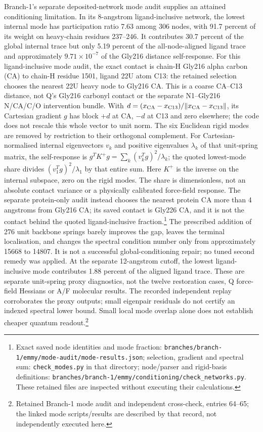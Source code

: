\documentclass{article}
\begin{document}
Branch-1's separate deposited-network mode audit supplies an attained conditioning limitation. In its 8-angstrom ligand-inclusive network, the lowest internal mode has participation ratio 7.63 among 306 nodes, with 91.7 percent of its weight on heavy-chain residues 237--246. It contributes 30.7 percent of the global internal trace but only 5.19 percent of the all-node-aligned ligand trace and approximately \(9.71\times10^{-7}\) of the Gly216 distance self-response. For this ligand-inclusive mode audit, the exact contact is chain-H Gly216 alpha carbon (CA) to chain-H residue 1501, ligand 22U atom C13: the retained selection chooses the nearest 22U heavy node to Gly216 CA. This is a coarse CA--C13 distance, not Q's Gly216 carbonyl contact or the separate N1--Gly216 N/CA/C/O intervention bundle. With \(d=(x_{\rm CA}-x_{\rm C13})/\lVert x_{\rm CA}-x_{\rm C13}\rVert\), its Cartesian gradient \(g\) has block \(+d\) at CA, \(-d\) at C13 and zero elsewhere; the code does not rescale this whole vector to unit norm. The six Euclidean rigid modes are removed by restriction to their orthogonal complement. For Cartesian-normalised internal eigenvectors \(v_k\) and positive eigenvalues \(\lambda_k\) of that unit-spring matrix, the self-response is \(g^TK^+g=\sum_k(v_k^Tg)^2/\lambda_k\); the quoted lowest-mode share divides \((v_1^Tg)^2/\lambda_1\) by that entire sum. Here \(K^+\) is the inverse on the internal subspace, zero on the rigid modes. The share is dimensionless, not an absolute contact variance or a physically calibrated force-field response. The separate protein-only audit instead chooses the nearest protein CA more than 4 angstroms from Gly216 CA; its saved contact is Gly226 CA, and it is not the contact behind the quoted ligand-inclusive fraction.\footnote{Exact saved node identities and mode fraction: \texttt{branches/branch-1/emmy/mode-audit/mode-results.json}; selection, gradient and spectral sum: \texttt{check\_modes.py} in that directory; node/parser and rigid-basis definitions: \texttt{branches/branch-1/emmy/conditioning/check\_networks.py}. These retained files are inspected without executing their calculations.} The prescribed addition of 276 unit backbone springs barely improves the gap, leaves the terminal localisation, and changes the spectral condition number only from approximately 15668 to 14807. It is not a successful global-conditioning repair; no tuned second remedy was applied. At the separate 12-angstrom cutoff, the lowest ligand-inclusive mode contributes 1.88 percent of the aligned ligand trace. These are separate unit-spring proxy diagnostics, not the twelve restoration cases, Q force-field Hessians or A/F molecular results. The recorded independent replay corroborates the proxy outputs; small eigenpair residuals do not certify an indexed spectral lower bound. Small local mode overlap alone does not establish cheaper quantum readout.\footnote{Retained Branch-1 mode audit and independent cross-check, entries 64--65; the linked mode scripts/results are described by that record, not independently executed here.}
\end{document}

